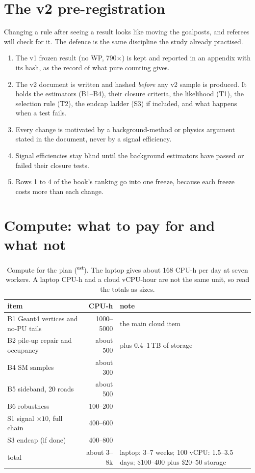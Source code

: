 \documentclass[11pt,a4paper]{article}
\newcommand{\EST}{\textsuperscript{\textsf{est}}}
\begin{document}
\section{The v2 pre-registration}\label{sec:prereg}
Changing a rule after seeing a result looks like moving the goalposts, and referees will check for it. The defence is the
same discipline the study already practised.
\begin{enumerate}
  \item The v1 frozen result (no WP, 790$\times$) is kept and reported in an appendix with its hash, as the record of what
        pure counting gives.
  \item The v2 document is written and hashed \emph{before} any v2 sample is produced. It holds the estimators (B1--B4),
        their closure criteria, the likelihood (T1), the selection rule (T2), the endcap ladder (S3) if included, and what
        happens when a test fails.
  \item Every change is motivated by a background-method or physics argument stated in the document, never by a signal
        efficiency.
  \item Signal efficiencies stay blind until the background estimators have passed or failed their closure tests.
  \item Rows 1 to 4 of the book's ranking go into one freeze, because each freeze costs more than each change.
\end{enumerate}

\section{Compute: what to pay for and what not}
\begin{table}[h]
\centering\small
\caption{Compute for the plan (\EST). The laptop gives about 168 CPU-h per day at seven workers. A laptop CPU-h and a
cloud vCPU-hour are not the same unit, so read the totals as sizes.}\label{tab:cpu}
\begin{tabularx}{\linewidth}{@{}P{55mm}rL@{}}
\toprule
item & CPU-h & note\\
\midrule
B1 Geant4 vertices and no-PU tails & 1000--5000 & the main cloud item \\
B2 pile-up repair and occupancy & about 500 & plus 0.4--1\,TB of storage \\
B4 SM samples & about 300 & \\
B5 sideband, 20 roads & about 500 & \\
B6 robustness & 100--200 & \\
S1 signal $\times10$, full chain & 400--600 & \\
S3 endcap (if done) & 400--800 & \\
\midrule
total & about 3--8k & laptop: 3--7 weeks; 100 vCPU: 1.5--3.5 days; \$100--400 plus \$20--50 storage \\
\bottomrule
\end{tabularx}
\end{table}
\end{document}

